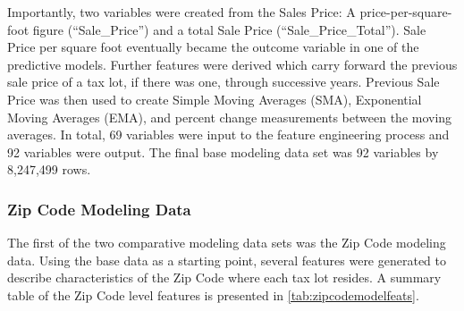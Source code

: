 \documentclass[12pt,]{article}
\begin{document}
Importantly, two variables were created from the Sales Price: A
price-per-square-foot figure (``Sale\_Price'') and a total Sale Price
(``Sale\_Price\_Total''). Sale Price per square foot eventually became
the outcome variable in one of the predictive models. Further features
were derived which carry forward the previous sale price of a tax lot,
if there was one, through successive years. Previous Sale Price was then
used to create Simple Moving Averages (SMA), Exponential Moving Averages
(EMA), and percent change measurements between the moving averages. In
total, 69 variables were input to the feature engineering process and 92
variables were output. The final base modeling data set was 92 variables
by 8,247,499 rows.

\hypertarget{zip-code-modeling-data}{%
\subsubsection{Zip Code Modeling Data}\label{zip-code-modeling-data}}

The first of the two comparative modeling data sets was the Zip Code
modeling data. Using the base data as a starting point, several features
were generated to describe characteristics of the Zip Code where each
tax lot resides. A summary table of the Zip Code level features is
presented in \ref{tab:zipcodemodelfeats}.
\end{document}
